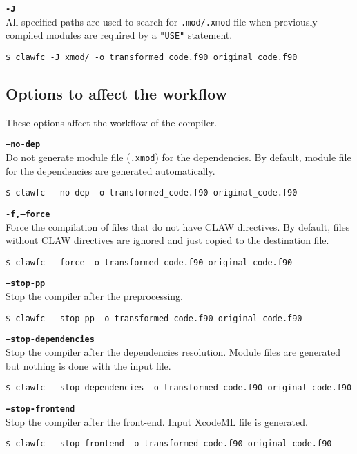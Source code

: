 \documentclass{article}
\begin{document}
\textbf{\texttt{-J}}\\
All specified paths are used to search for \texttt{.mod/.xmod} file when previously compiled modules are required by a \texttt{"USE"} statement.
\begin{lstlisting}
$ clawfc -J xmod/ -o transformed_code.f90 original_code.f90
\end{lstlisting}

\subsection{Options to affect the workflow}
These options affect the workflow of the compiler.

\textbf{\texttt{--no-dep}}\\
Do not generate module file (\texttt{.xmod}) for the dependencies. By default, module file for the dependencies are generated automatically.
\begin{lstlisting}
$ clawfc --no-dep -o transformed_code.f90 original_code.f90
\end{lstlisting}

\textbf{\texttt{-f,--force}}\\
Force the compilation of files that do not have CLAW directives. By default, files without CLAW directives are ignored and just copied to the destination file.
\begin{lstlisting}
$ clawfc --force -o transformed_code.f90 original_code.f90
\end{lstlisting}

\textbf{\texttt{--stop-pp}}\\
Stop the compiler after the preprocessing.
\begin{lstlisting}
$ clawfc --stop-pp -o transformed_code.f90 original_code.f90
\end{lstlisting}

\textbf{\texttt{--stop-dependencies}}\\
Stop the compiler after the dependencies resolution. Module files are generated but nothing is done with the input file.
\begin{lstlisting}
$ clawfc --stop-dependencies -o transformed_code.f90 original_code.f90
\end{lstlisting}

\textbf{\texttt{--stop-frontend}}\\
Stop the compiler after the front-end. Input XcodeML file is generated.
\begin{lstlisting}
$ clawfc --stop-frontend -o transformed_code.f90 original_code.f90
\end{lstlisting}
\end{document}
